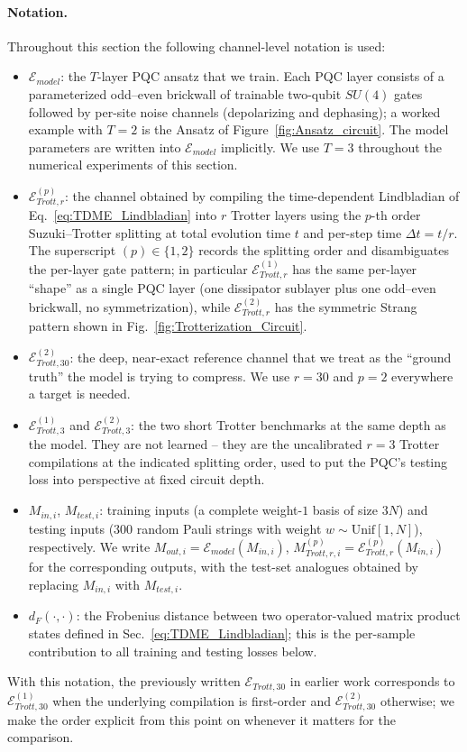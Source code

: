 \documentclass[%
 reprint,
superscriptaddress,
 amsmath,amssymb,
 aps,
]{revtex4-2}
\newcommand{\E}{\mathcal{E}}
\begin{document}
\paragraph{Notation.} Throughout this section the following channel-level notation is used:
\begin{itemize}
    \item $\E_{model}$: the $T$-layer PQC ansatz that we train. Each PQC layer consists of a parameterized odd--even brickwall of trainable two-qubit $SU(4)$ gates followed by per-site noise channels (depolarizing and dephasing); a worked example with $T=2$ is the Ansatz of Figure~\ref{fig:Ansatz_circuit}. The model parameters are written into $\E_{model}$ implicitly. We use $T=3$ throughout the numerical experiments of this section.
    \item $\E_{Trott,r}^{(p)}$: the channel obtained by compiling the time-dependent Lindbladian of Eq.~\ref{eq:TDME_Lindbladian} into $r$ Trotter layers using the $p$-th order Suzuki--Trotter splitting at total evolution time $t$ and per-step time $\Delta t = t/r$. The superscript $(p)\in\{1,2\}$ records the splitting order and disambiguates the per-layer gate pattern; in particular $\E_{Trott,r}^{(1)}$ has the same per-layer ``shape'' as a single PQC layer (one dissipator sublayer plus one odd--even brickwall, no symmetrization), while $\E_{Trott,r}^{(2)}$ has the symmetric Strang pattern shown in Fig.~\ref{fig:Trotterization_Circuit}.
    \item $\E_{Trott,30}^{(2)}$: the deep, near-exact reference channel that we treat as the ``ground truth'' the model is trying to compress. We use $r=30$ and $p=2$ everywhere a target is needed.
    \item $\E_{Trott,3}^{(1)}$ and $\E_{Trott,3}^{(2)}$: the two short Trotter benchmarks at the same depth as the model. They are not learned -- they are the uncalibrated $r=3$ Trotter compilations at the indicated splitting order, used to put the PQC's testing loss into perspective at fixed circuit depth.
    \item $M_{in,i}$, $M_{test,i}$: training inputs (a complete weight-$1$ basis of size $3N$) and testing inputs (300 random Pauli strings with weight $w\sim\mathrm{Unif}[1,N]$), respectively. We write $M_{out,i}=\E_{model}(M_{in,i})$, $M_{Trott,r,i}^{(p)}=\E_{Trott,r}^{(p)}(M_{in,i})$ for the corresponding outputs, with the test-set analogues obtained by replacing $M_{in,i}$ with $M_{test,i}$.
    \item $d_F(\cdot,\cdot)$: the Frobenius distance between two operator-valued matrix product states defined in Sec.~\ref{eq:TDME_Lindbladian}; this is the per-sample contribution to all training and testing losses below.
\end{itemize}
With this notation, the previously written $\E_{Trott,30}$ in earlier work corresponds to $\E_{Trott,30}^{(1)}$ when the underlying compilation is first-order and $\E_{Trott,30}^{(2)}$ otherwise; we make the order explicit from this point on whenever it matters for the comparison.
\end{document}
